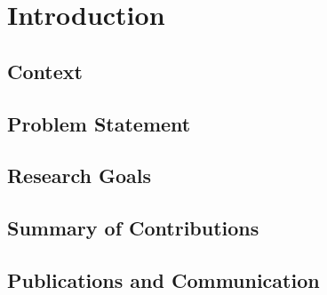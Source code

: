 \chapter{Introduction}
\label{chap1}

\section{Context}

\section{Problem Statement}

\section{Research Goals}

\section{Summary of Contributions}

\section{Publications and Communication}

